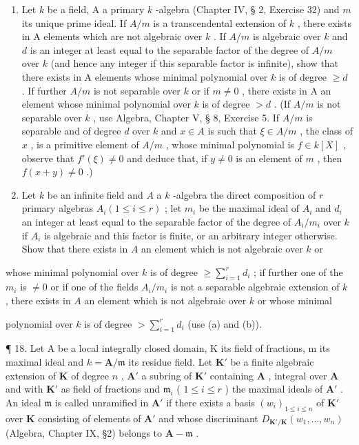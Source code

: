 \begin{enumerate}
\def\labelenumi{(\alph{enumi})}
\setcounter{enumi}{1}
\item
  Let \(k\) be a field, A a primary \(k\) -algebra (Chapter IV, § 2, Exercise 32) and \(m\) its unique prime ideal. If \(A / m\) is a transcendental extension of \(k\) , there exists in A elements which are not algebraic over \(k\) . If \(A / m\) is algebraic over \(k\) and \(d\) is an integer at least equal to the separable factor of the degree of \(A / m\) over \(k\) (and hence any integer if this separable factor is infinite), show that there exists in A elements whose minimal polynomial over \(k\) is of degree \(\geqslant d\) . If further \(A / m\) is not separable over \(k\) or if \(m \neq 0\) , there exists in A an element whose minimal polynomial over \(k\) is of degree \(>d\) . (If \(A / m\) is not separable over \(k\) , use Algebra, Chapter V, § 8, Exercise 5. If \(A / m\) is separable and of degree \(d\) over \(k\) and \(x \in A\) is such that \(\xi \in A / m\) , the class of \(x\) , is a primitive element of \(A / m\) , whose minimal polynomial is \(f \in k[X]\) , observe that \(f'(\xi) \neq 0\) and deduce that, if \(y \neq 0\) is an element of \(m\) , then \(f(x + y) \neq 0\) .)
\item
  Let \(k\) be an infinite field and \(A\) a \(k\) -algebra the direct composition of \(r\) primary algebras \(A_{i} (1 \leqslant i \leqslant r)\) ; let \(m_{i}\) be the maximal ideal of \(A_{i}\) and \(d_{i}\) an integer at least equal to the separable factor of the degree of \(A_{i} / m_{i}\) over \(k\) if \(A_{i}\) is algebraic and this factor is finite, or an arbitrary integer otherwise. Show that there exists in \(A\) an element which is not algebraic over \(k\) or
\end{enumerate}

whose minimal polynomial over \(k\) is of degree \(\geqslant \sum_{i=1}^{r} d_i\) ; if further one of the \(m_i\) is \(\neq 0\) or if one of the fields \(A_i / m_i\) is not a separable algebraic extension of \(k\) , there exists in \(A\) an element which is not algebraic over \(k\) or whose minimal

polynomial over \(k\) is of degree \(> \sum_{i=1}^{r} d_i\) (use (a) and (b)).

¶ 18. Let A be a local integrally closed domain, K its field of fractions, m its maximal ideal and \(k = \mathbf{A} / \mathfrak{m}\) its residue field. Let \(\mathbf{K}'\) be a finite algebraic extension of \(\mathbf{K}\) of degree \(n\) , \(\mathbf{A}'\) a subring of \(\mathbf{K}'\) containing \(\mathbf{A}\) , integral over \(\mathbf{A}\) and with \(\mathbf{K}'\) as field of fractions and \(\mathfrak{m}_i\) ( \(1 \leqslant i \leqslant r\) ) the maximal ideals of \(\mathbf{A}'\) . An ideal \(\mathfrak{m}\) is called unramified in \(\mathbf{A}'\) if there exists a basis \((w_i)_{1 \leqslant i \leqslant n}\) of \(\mathbf{K}'\) over \(\mathbf{K}\) consisting of elements of \(\mathbf{A}'\) and whose discriminant \(D_{\mathbf{K}' / \mathbf{K}}(w_1, \ldots, w_n)\) (Algebra, Chapter IX, §2) belongs to \(\mathbf{A} - \mathfrak{m}\) .

